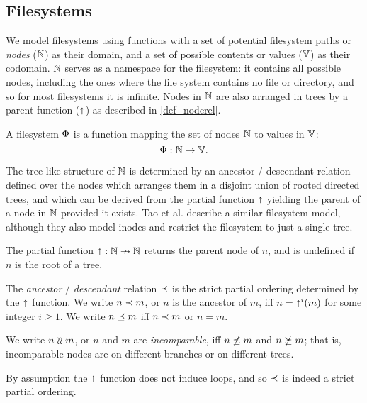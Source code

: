 
\subsection{Filesystems}

We model filesystems using functions with a set of potential filesystem paths or \emph{nodes} ($\mathbb{N}$) as their domain,
and a set of possible contents or values ($\mathbb{V}$) as their codomain.
$\mathbb{N}$  serves as a namespace for the filesystem:
it contains all possible nodes, including the ones 
where the file system contains no file or directory,
and so for most filesystems it is infinite.
Nodes in $\mathbb{N}$ are also arranged in trees by a parent function ($\mathord{\shortuparrow}$) as described in \cref{def_noderel}.

\begin{mydef}[Filesystems, $\FS$]
A filesystem $\FS$ is a function
mapping the set of nodes $\mathbb{N}$ to values in $\mathbb{V}$:
\[ \Phi: \mathbb{N} \rightarrow \mathbb{V}. \]
\end{mydef}


The tree-like structure of $\mathbb{N}$ is determined by
an ancestor / descendant relation defined over the nodes
which arranges them in a disjoint union of rooted directed trees,
and which can be derived from the partial function $\mathord{\shortuparrow}$ yielding
the parent of a node in $\mathbb{N}$ provided it exists.
Tao et al. \cite{TSR} describe a similar filesystem model, although
they also model inodes and restrict the filesystem to just a single tree.

\begin{mydef}
The partial function $\mathord{\shortuparrow}:\mathbb{N}\nrightarrow\mathbb{N}$
returns the parent node of $n$,
and is undefined if $n$ is the root of a tree.

The \emph{ancestor} / \emph{descendant} relation $\prec$ is the
strict partial ordering determined by the $\mathord{\shortuparrow}$ function.
We write $n\prec m$, or $n$ is the ancestor of $m$,
iff $n=\mathord{\shortuparrow}^i(m)$ for some integer $i\ge 1$.
We write $n\preceq m$ iff $n\prec m$ or $n=m$.

We write $n\mathrel{\wr\wr} m$, or $n$ and $m$ are \emph{incomparable},
iff $n\not\preceq m$ and $n\not\succeq m$;
that is, incomparable nodes are on different branches or on different trees.
\end{mydef}
By assumption the $\mathord{\shortuparrow}$ function does not induce loops, and so
$\prec$ is indeed a strict partial ordering.

